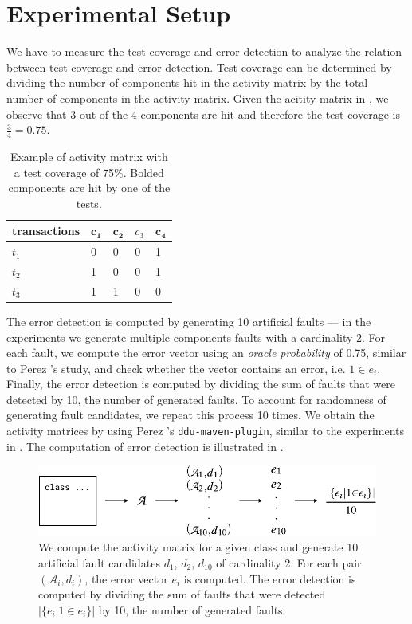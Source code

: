 \documentclass[twoside,a4paper,11pt]{memoir}
\begin{document}
\section{Experimental Setup}
We have to measure the test coverage and error detection to analyze the relation between test coverage and error detection.
Test coverage can be determined by dividing the number of components hit in the activity matrix by the total number of components in the activity matrix.
Given the acitity matrix in , we observe that 3 out of the 4 components are hit and therefore the test coverage is \(\frac{3}{4} = 0.75 \).
\begin{table}[]
\centering
\caption{Example of activity matrix with a test coverage of 75\%. Bolded components are hit by one of the tests.}%
\label{tab:test_coverage}
\begin{tabular}{l|llll}
transactions & \(\mathbf{c_1} \) & \(\mathbf{c_2} \) & \(c_3 \) & \(\mathbf{c_4} \) \\ \hline
\(t_1 \) & 0 & 0 & 0 & 1 \\
\(t_2 \) & 1 & 0 & 0 & 1 \\
\(t_3 \) & 1 & 1 & 0 & 0
\end{tabular}
\end{table}
The error detection is computed by generating 10 artificial faults --- in the experiments we generate multiple components faults with a cardinality 2.
For each fault, we compute the error vector using an \emph{oracle probability} of 0.75, similar to Perez \etal's study, and check whether the vector contains an error, i.e. \(1 \in e_i \).
Finally, the error detection is computed by dividing the sum of faults that were detected by 10, the number of generated faults.
To account for randomness of generating fault candidates, we repeat this process 10 times.
We obtain the activity matrices by using Perez \etal's \texttt{ddu-maven-plugin}, similar to the experiments in .
The computation of error detection is illustrated in .
\begin{figure}[b]
  \includegraphics[width=\linewidth]{figures/error_detection}
  \caption{We compute the activity matrix for a given class and generate 10 artificial fault candidates \(d_1 \), \(d_2 \), \(d_{10}\) of cardinality 2. For each pair \((\mathcal{A}_i, d_i) \), the error vector \(e_i \) is computed. The error detection is computed by dividing the sum of faults that were detected \(|\{e_i | 1 \in e_i \}|\) by 10, the number of generated faults.}%
  \label{fig:error_detection_computation}
\end{figure}
\end{document}
